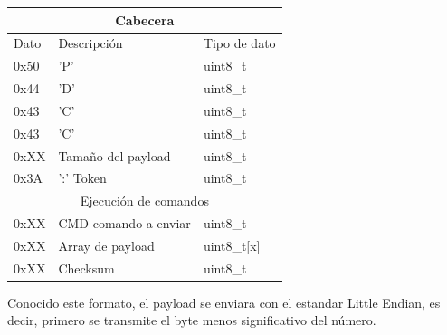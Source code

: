 \documentclass[12pt]{article}
\begin{document}
\begin{table}[H]
\begin{center}
\begin{tabular}{|l|l|l|}
\hline
\multicolumn{3}{|c|}{Cabecera} \\
\hline
Dato & Descripción & Tipo de dato \\
\hline
0x50 & 'P' & uint8\_t \\
\hline
0x44 & 'D' & uint8\_t \\
\hline
0x43 & 'C' & uint8\_t \\
\hline
0x43 & 'C' & uint8\_t \\
\hline
0xXX & Tamaño del payload & uint8\_t \\
\hline
0x3A & ':' Token & uint8\_t \\
\hline
\multicolumn{3}{|c|}{Ejecución de comandos} \\
\hline
0xXX & CMD comando a enviar & uint8\_t \\
\hline
0xXX & Array de payload & uint8\_t[x] \\
\hline
0xXX & Checksum & uint8\_t \\
\hline
\end{tabular}
\end{center}
\end{table}

Conocido este formato, el payload se enviara con el estandar Little Endian, es decir, primero se
transmite el byte menos significativo del número.
\end{document}

